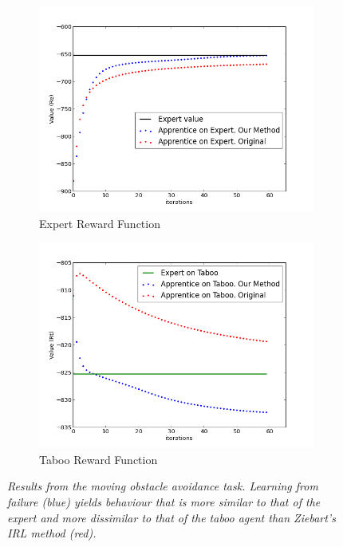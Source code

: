 \documentclass[conference]{IEEEtran}
\begin{document}
\begin{figure}[t]
  \hspace{-5pt}
  \begin{subfigure}{0.26\textwidth}

    \includegraphics[scale = 0.22]{figures/resa.png}
    \caption{Expert Reward Function}
    \label{fig:res_a}
  \end{subfigure}
  \hspace{-25pt}
  \begin{subfigure}{0.26\textwidth}
	  
    \includegraphics[scale = 0.22]{figures/resb.png}
        \caption{Taboo Reward Function}
    \label{fig:res_b}
\end{subfigure}
  \caption{\small{\textit{Results from the moving obstacle avoidance task.  Learning from failure (blue) yields behaviour that is more similar to that of the expert and more dissimilar to that of the taboo agent than Ziebart's IRL method (red).}} }
  \label{fig:res}
\vspace{-4mm}
\end{figure}
\end{document}

